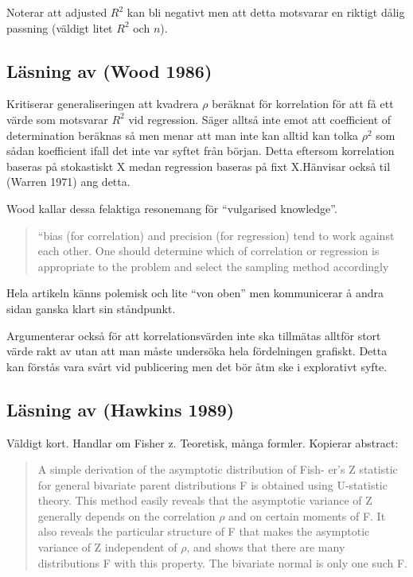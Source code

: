 \documentclass[]{article}
\begin{document}
Noterar att adjusted \(R^2\) kan bli negativt men att detta motsvarar en
riktigt dålig passning (väldigt litet \(R^2\) och \(n\)).

\subsection{Läsning av (Wood 1986)}\label{lasning-av-wood1986}

Kritiserar generaliseringen att kvadrera \(\rho\) beräknat för
korrelation för att få ett värde som motsvarar \(R^2\) vid regression.
Säger alltså inte emot att coefficient of determination beräknas så men
menar att man inte kan alltid kan tolka \(\rho^2\) som sådan koefficient
ifall det inte var syftet från början. Detta eftersom korrelation
baseras på stokastiskt X medan regression baseras på fixt X.Hänvisar
också til (Warren 1971) ang detta.

Wood kallar dessa felaktiga resonemang för ``vulgarised knowledge''.

\begin{quote}
``bias (for correlation) and precision (for regression) tend to work
against each other. One should determine which of correlation or
regression is appropriate to the problem and select the sampling method
accordingly
\end{quote}

Hela artikeln känns polemisk och lite ``von oben'' men kommunicerar å
andra sidan ganska klart sin ståndpunkt.

Argumenterar också för att korrelationsvärden inte ska tillmätas alltför
stort värde rakt av utan att man måste undersöka hela fördelningen
grafiskt. Detta kan förstås vara svårt vid publicering men det bör åtm
ske i explorativt syfte.

\subsection{Läsning av (Hawkins 1989)}\label{lasning-av-hawkins1989}

Väldigt kort. Handlar om Fisher z. Teoretisk, många formler. Kopierar
abstract:

\begin{quote}
A simple derivation of the asymptotic distribution of Fish- er's Z
statistic for general bivariate parent distributions F is obtained using
U-statistic theory. This method easily reveals that the asymptotic
variance of Z generally depends on the correlation \(\rho\) and on
certain moments of F. It also reveals the particular structure of F that
makes the asymptotic variance of Z independent of \(\rho\), and shows
that there are many distributions F with this property. The bivariate
normal is only one such F.
\end{quote}
\end{document}
